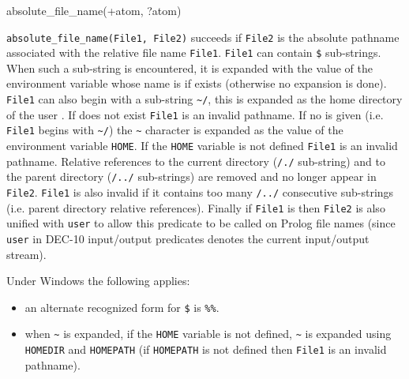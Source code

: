 \subsubsection{\label{absolute-file-name/2}}

\begin{TemplatesOneCol}
absolute\_file\_name(+atom, ?atom)

\end{TemplatesOneCol}

\Description

\texttt{absolute\_file\_name(File1, File2)} succeeds if \texttt{File2} is
the absolute pathname associated with the relative file name \texttt{File1}.
\texttt{File1} can contain \texttt{\$} sub-strings. When
such a sub-string is encountered, it is expanded with the value of the
environment variable whose name is  if exists
(otherwise no expansion is done). \texttt{File1} can also begin with a
sub-string \texttt{\~{}/}, this is expanded as the home
directory of the user . If
 does not exist \texttt{File1} is an invalid
pathname. If no  is given (i.e. \texttt{File1}
begins with \texttt{\~{}/}) the \texttt{\~{}} character is expanded as the
value of the environment variable \texttt{HOME}. If the \texttt{HOME}
variable is not defined \texttt{File1} is an invalid pathname. Relative
references to the current directory (\texttt{/./} sub-string) and to the
parent directory (\texttt{/../} sub-strings) are removed and no longer
appear in \texttt{File2}. \texttt{File1} is also invalid if it contains too
many \texttt{/../} consecutive sub-strings (i.e. parent directory relative
references). Finally if \texttt{File1} is  then \texttt{File2}
is also unified with \texttt{user} to allow this predicate to be called on
Prolog file names (since \texttt{user} in DEC-10 input/output predicates
denotes the current input/output stream).

Under Windows the following applies: 
\begin{itemize}
\item an alternate recognized form for \texttt{\$} is
  \texttt{\%\%}. 

\item when \texttt{\~{}} is expanded, if the \texttt{HOME} variable is not defined, \texttt{\~{}} is expanded using \texttt{HOMEDIR} and
  \texttt{HOMEPATH} (if \texttt{HOMEPATH} is not defined then \texttt{File1}
  is an invalid pathname).
\end{itemize}

